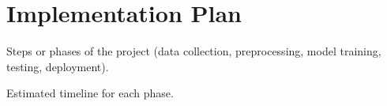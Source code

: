 \section{Implementation Plan}

Steps or phases of the project (data collection, preprocessing, model training, testing, deployment).
    
Estimated timeline for each phase.